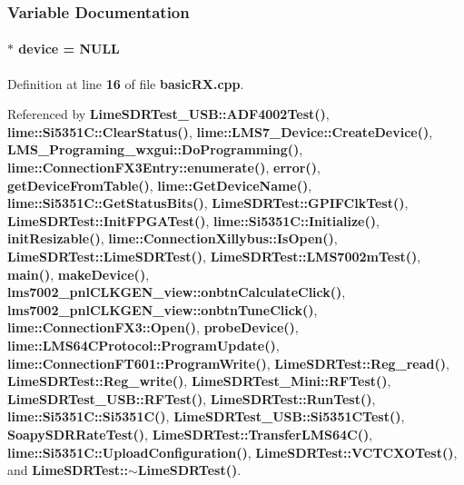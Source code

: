 \subsubsection{Variable Documentation}
\paragraph[{device}]{$\ast$ device = N\+U\+LL}\label{basicRX_8cpp_a6bc15a746822d9c4a5621463acd4ca25}


Definition at line {\bf 16} of file {\bf basic\+R\+X.\+cpp}.



Referenced by {\bf Lime\+S\+D\+R\+Test\+\_\+\+U\+S\+B\+::\+A\+D\+F4002\+Test()}, {\bf lime\+::\+Si5351\+C\+::\+Clear\+Status()}, {\bf lime\+::\+L\+M\+S7\+\_\+\+Device\+::\+Create\+Device()}, {\bf L\+M\+S\+\_\+\+Programing\+\_\+wxgui\+::\+Do\+Programming()}, {\bf lime\+::\+Connection\+F\+X3\+Entry\+::enumerate()}, {\bf error()}, {\bf get\+Device\+From\+Table()}, {\bf lime\+::\+Get\+Device\+Name()}, {\bf lime\+::\+Si5351\+C\+::\+Get\+Status\+Bits()}, {\bf Lime\+S\+D\+R\+Test\+::\+G\+P\+I\+F\+Clk\+Test()}, {\bf Lime\+S\+D\+R\+Test\+::\+Init\+F\+P\+G\+A\+Test()}, {\bf lime\+::\+Si5351\+C\+::\+Initialize()}, {\bf init\+Resizable()}, {\bf lime\+::\+Connection\+Xillybus\+::\+Is\+Open()}, {\bf Lime\+S\+D\+R\+Test\+::\+Lime\+S\+D\+R\+Test()}, {\bf Lime\+S\+D\+R\+Test\+::\+L\+M\+S7002m\+Test()}, {\bf main()}, {\bf make\+Device()}, {\bf lms7002\+\_\+pnl\+C\+L\+K\+G\+E\+N\+\_\+view\+::onbtn\+Calculate\+Click()}, {\bf lms7002\+\_\+pnl\+C\+L\+K\+G\+E\+N\+\_\+view\+::onbtn\+Tune\+Click()}, {\bf lime\+::\+Connection\+F\+X3\+::\+Open()}, {\bf probe\+Device()}, {\bf lime\+::\+L\+M\+S64\+C\+Protocol\+::\+Program\+Update()}, {\bf lime\+::\+Connection\+F\+T601\+::\+Program\+Write()}, {\bf Lime\+S\+D\+R\+Test\+::\+Reg\+\_\+read()}, {\bf Lime\+S\+D\+R\+Test\+::\+Reg\+\_\+write()}, {\bf Lime\+S\+D\+R\+Test\+\_\+\+Mini\+::\+R\+F\+Test()}, {\bf Lime\+S\+D\+R\+Test\+\_\+\+U\+S\+B\+::\+R\+F\+Test()}, {\bf Lime\+S\+D\+R\+Test\+::\+Run\+Test()}, {\bf lime\+::\+Si5351\+C\+::\+Si5351\+C()}, {\bf Lime\+S\+D\+R\+Test\+\_\+\+U\+S\+B\+::\+Si5351\+C\+Test()}, {\bf Soapy\+S\+D\+R\+Rate\+Test()}, {\bf Lime\+S\+D\+R\+Test\+::\+Transfer\+L\+M\+S64\+C()}, {\bf lime\+::\+Si5351\+C\+::\+Upload\+Configuration()}, {\bf Lime\+S\+D\+R\+Test\+::\+V\+C\+T\+C\+X\+O\+Test()}, and {\bf Lime\+S\+D\+R\+Test\+::$\sim$\+Lime\+S\+D\+R\+Test()}.

